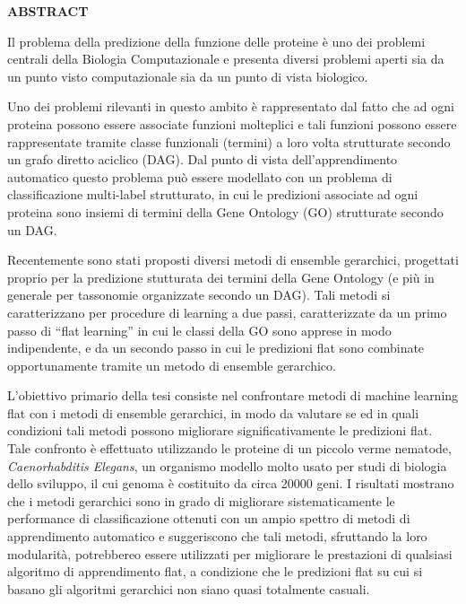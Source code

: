 \documentclass[12pt]{report}
\begin{document}
%
%
%
%

% 
% 

\Large
 \begin{center}
\textbf{ABSTRACT}
\end{center}

\hspace{10pt}



\normalsize

Il problema della predizione della funzione delle proteine \`e uno dei problemi centrali della Biologia Computazionale e presenta diversi problemi aperti sia da un punto visto computazionale sia da un punto di vista biologico.

Uno dei problemi rilevanti in questo ambito \`e rappresentato dal fatto che ad ogni proteina possono essere associate funzioni molteplici e tali funzioni possono essere rappresentate tramite classe funzionali (termini) a loro volta strutturate secondo un grafo diretto aciclico (DAG). Dal punto di vista dell'apprendimento automatico questo problema pu\`o essere modellato con un problema di classificazione multi-label strutturato, in cui le predizioni associate ad ogni proteina sono insiemi di termini della Gene Ontology (GO) strutturate secondo un DAG.

Recentemente sono stati proposti diversi metodi di ensemble gerarchici, progettati proprio per la predizione stutturata dei termini della Gene Ontology (e pi\`u in generale per tassonomie organizzate secondo un DAG). Tali metodi si caratterizzano per procedure di learning a due passi, caratterizzate da un primo passo di ``flat learning'' in cui le classi della GO sono apprese in modo indipendente, e da un secondo passo in cui le predizioni flat sono combinate opportunamente tramite un metodo di ensemble gerarchico.

L'obiettivo primario della tesi  consiste nel confrontare metodi di machine learning flat con i metodi di ensemble gerarchici, in modo da valutare se ed in quali condizioni tali metodi possono migliorare significativamente le predizioni flat. 
Tale confronto  \`e effettuato utilizzando le proteine di un piccolo verme nematode, \emph{Caenorhabditis Elegans}, un organismo modello molto usato per studi di biologia dello sviluppo, il cui genoma  \`e costituito da circa 20000 geni.
I risultati mostrano che i metodi gerarchici sono in grado di migliorare sistematicamente le performance di classificazione ottenuti con un ampio spettro di metodi di apprendimento automatico e suggeriscono che tali metodi, sfruttando la loro modularit\`a, potrebbereo essere utilizzati per migliorare le prestazioni di qualsiasi algoritmo di apprendimento flat, a condizione che le predizioni flat su cui si basano gli algoritmi gerarchici non siano quasi totalmente casuali.
\end{document}
